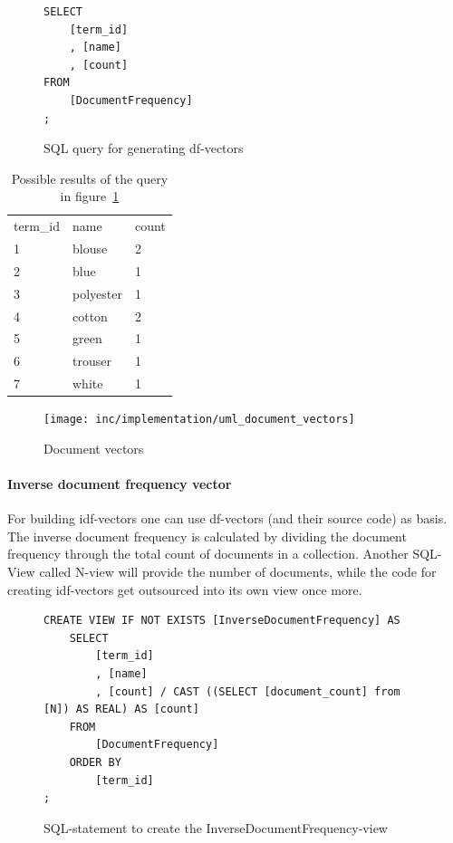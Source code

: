\begin{figure}[h]
    \lstset{language=SQL}
    \begin{lstlisting}
SELECT
    [term_id]
    , [name]
    , [count]
FROM
    [DocumentFrequency]
;
    \end{lstlisting}
    \caption{SQL query for generating df-vectors}
    \label{fig:df-query}
\end{figure}

\begin{table}
    \center
    \begin{tabular}{ l | l | l } 
        \rowcolor{LightSlateGrey}
        \multicolumn{3}{ c }{\textbf{df}}\\\hline
        term\_id    & name      & count\\\hline
        1           & blouse    & 2\\
        2           & blue      & 1\\
        3           & polyester & 1\\
        4           & cotton    & 2\\
        5           & green     & 1\\
        6           & trouser   & 1\\
        7           & white     & 1\\
    \end{tabular}
    \caption{Possible results of the query in figure~\ref{fig:df-query}}
    \label{tab:df-query-result}
\end{table}

\begin{figure}[h]
    \center
    \texttt{[image: inc/implementation/uml\_document\_vectors]}
    \caption{Document vectors}
    \label{fig:uml-document-vectors}
\end{figure}

\paragraph{Inverse document frequency vector}
For building idf-vectors one can use df-vectors (and their source code) as basis.
The inverse document frequency is calculated by dividing the document frequency through the total count of documents in a collection.
Another SQL-View called N-view will provide the number of documents, while the code for creating idf-vectors get outsourced into its own view once more.


\begin{figure}
    \lstset{language=SQL}
    \begin{lstlisting}
CREATE VIEW IF NOT EXISTS [InverseDocumentFrequency] AS
    SELECT
        [term_id]
        , [name]
        , [count] / CAST ((SELECT [document_count] from [N]) AS REAL) AS [count]
    FROM
        [DocumentFrequency]
    ORDER BY
        [term_id]
;
    \end{lstlisting}
    \caption{SQL-statement to create the InverseDocumentFrequency-view}
    \label{fig:idf-view}
\end{figure}


